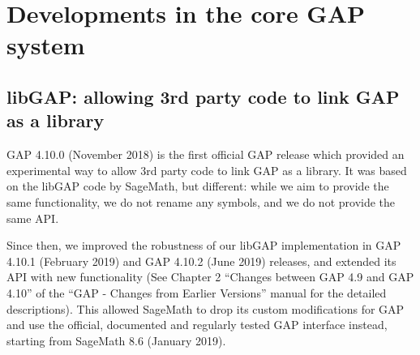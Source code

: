 \documentclass{deliverablereport}
\author{Author names}
\begin{document}
\maketitle
\githubissuedescription



\section{Developments in the core GAP system}

\subsection{libGAP: allowing 3rd party code to link GAP as a library}

GAP 4.10.0 (November 2018) is the first official GAP release
which provided an experimental way to allow 3rd party code to 
link GAP as a library. It was based on the libGAP code by SageMath, 
but different: while we aim to provide the same functionality, 
we do not rename any symbols, and we do not provide the same API. 

Since then, we improved the robustness of our libGAP implementation
in GAP 4.10.1 (February 2019) and GAP 4.10.2 (June 2019) releases,
and extended its API with new functionality (See Chapter 2 
``Changes between GAP 4.9 and GAP 4.10'' of the 
``GAP - Changes from Earlier Versions'' manual for the detailed
descriptions). This allowed SageMath to drop its custom 
modifications for GAP and use the official, documented and regularly 
tested GAP interface instead, starting from SageMath 8.6 (January 2019).


%
%


\end{document}
